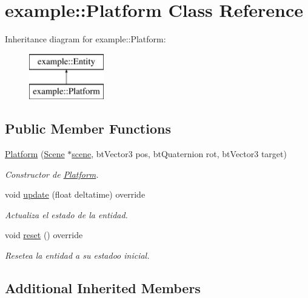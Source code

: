 \hypertarget{classexample_1_1_platform}{}\section{example\+::Platform Class Reference}
\label{classexample_1_1_platform}
Inheritance diagram for example\+::Platform\+:\begin{figure}[H]
\begin{center}
\leavevmode
\includegraphics[height=2.000000cm]{classexample_1_1_platform}
\end{center}
\end{figure}
\subsection*{Public Member Functions}
\begin{DoxyCompactItemize}
\item 
\mbox{\hyperlink{classexample_1_1_platform_ac084b2635cc780969436622154a0be5f}{Platform}} (\mbox{\hyperlink{classexample_1_1_scene}{Scene}} $\ast$\mbox{\hyperlink{classexample_1_1_entity_ab851dbde4a16829f9fb77ab9a66b9f1e}{scene}}, bt\+Vector3 pos, bt\+Quaternion rot, bt\+Vector3 target)
\begin{DoxyCompactList}\small\item\em Constructor de \mbox{\hyperlink{classexample_1_1_platform}{Platform}}. \end{DoxyCompactList}\item 
void \mbox{\hyperlink{classexample_1_1_platform_a6e8de925951062be87fe836934b4a634}{update}} (float deltatime) override
\begin{DoxyCompactList}\small\item\em Actualiza el estado de la entidad. \end{DoxyCompactList}\item 
void \mbox{\hyperlink{classexample_1_1_platform_ae38e7d4e1870a52e5b070417c5a64cb4}{reset}} () override
\begin{DoxyCompactList}\small\item\em Resetea la entidad a su estadoo inicial. \end{DoxyCompactList}\end{DoxyCompactItemize}
\subsection*{Additional Inherited Members}


